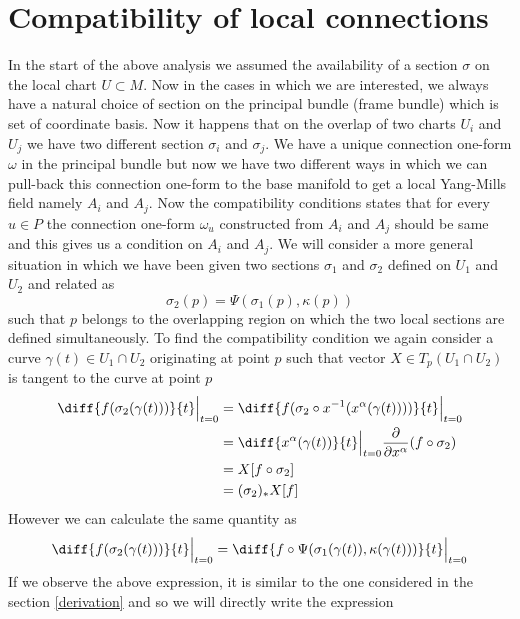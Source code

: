 \documentclass[12pt]{article}
\begin{document}
\section{Compatibility of local connections}
In the start of the above analysis we assumed the availability of a section $\sigma$ on the local chart $U \subset M$. Now in the cases in which we are interested, we always have a natural choice of section on the principal bundle (frame bundle) which is set of coordinate basis. Now it happens that on the overlap of two charts $U_{i}$ and $U_{j}$ we have two different section $\sigma_{i}$ and $\sigma_{j}$. We have a unique connection one-form $\omega$ in the principal bundle but now we have two different ways in which we can pull-back this connection one-form to the base manifold to get a local Yang-Mills field namely $A_{i}$ and $A_{j}$. Now the compatibility conditions states that for every $u \in P$ the connection one-form $\omega_{u}$ constructed from $A_{i}$ and $A_{j}$ should be same and this gives us a condition on $A_{i}$ and $A_{j}$. We will consider a more general situation in which we have been given two sections $\sigma_{1}$ and $\sigma_{2}$ defined on $U_{1}$ and $U_{2}$ and related as
\[
\sigma_{2}(p) = \Psi(\sigma_{1}(p), \kappa(p))
\] such that $p$ belongs to the overlapping region on which the two local sections are defined simultaneously. To find the compatibility condition we again consider a curve $\gamma(t) \in U_{1} \cap U_{2}$ originating at point $p$ such that vector $X \in T_{p}(U_{1} \cap U_{2})$ is tangent to the curve at point $p$
\begin{align*}
    \diff{f(\sigma_{2}(\gamma(t)))}{t}\Bigr|_{t=0} &= \diff{f(\sigma_{2}\circ x^{-1}(x^{\alpha}(\gamma(t))))}{t}\Bigr|_{t=0} \\
                                                   &= \diff{x^{\alpha}(\gamma(t))}{t}\Bigr|_{t=0}\frac{\partial}{\partial x^{\alpha}}(f\circ\sigma_{2}) \\
                                                   &= X[f\circ\sigma_{2}] \\
                                                   &= (\sigma_2)_{\ast}X[f]
\end{align*}However we can calculate the same quantity as \\
\begin{align*}
    \diff{f(\sigma_{2}(\gamma(t)))}{t}\Bigr|_{t=0} = \diff{f\circ\Psi(\sigma_{1}(\gamma(t)), \kappa(\gamma(t)))}{t}\Bigr|_{t=0}
\end{align*}If we observe the above expression, it is similar to the one considered in the section \ref{derivation} and so we will directly write the expression \\
\end{document}
